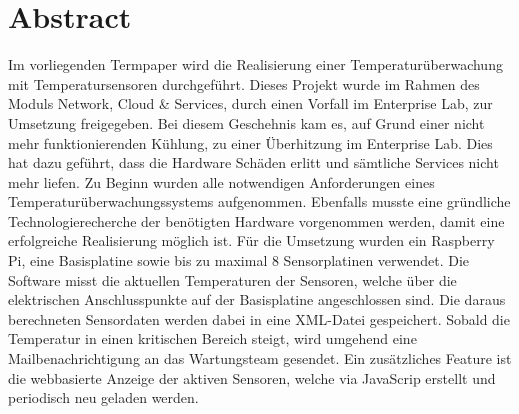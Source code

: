 \section*{Abstract}
Im vorliegenden Termpaper wird die Realisierung einer Temperaturüberwachung mit Temperatursensoren durchgeführt. Dieses Projekt  wurde im Rahmen des Moduls \glqq{}Network, Cloud \& Services\grqq{}, durch einen Vorfall im Enterprise Lab, zur Umsetzung freigegeben. Bei diesem Geschehnis kam es, auf Grund einer nicht mehr funktionierenden Kühlung, zu einer Überhitzung im Enterprise Lab. Dies hat dazu geführt, dass die Hardware Schäden erlitt und sämtliche Services nicht mehr liefen.
Zu Beginn wurden alle notwendigen Anforderungen eines Temperaturüberwachungssystems aufgenommen. Ebenfalls musste eine gründliche Technologierecherche der benötigten Hardware vorgenommen werden, damit eine erfolgreiche Realisierung möglich ist.
Für die Umsetzung wurden ein Raspberry Pi, eine Basisplatine sowie bis zu maximal 8 Sensorplatinen verwendet. Die Software misst die aktuellen Temperaturen der Sensoren, welche über die elektrischen Anschlusspunkte auf der Basisplatine angeschlossen sind. Die daraus berechneten Sensordaten werden dabei in eine XML-Datei gespeichert. Sobald die Temperatur in einen kritischen Bereich steigt, wird umgehend eine Mailbenachrichtigung an das Wartungsteam gesendet. Ein zusätzliches Feature ist die webbasierte Anzeige der aktiven Sensoren, welche via JavaScrip erstellt und periodisch neu geladen werden.
 
\clearpage